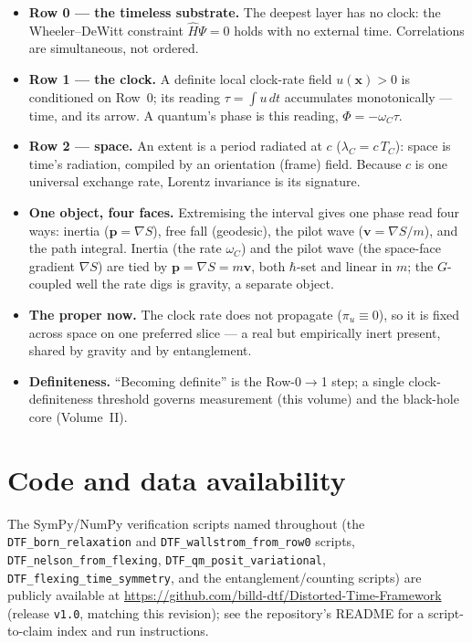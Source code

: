 \documentclass[11pt]{article}
\begin{document}
\begin{itemize}[leftmargin=1.4em,itemsep=3pt,topsep=3pt]
  \item \textbf{Row 0 --- the timeless substrate.} The deepest layer has no clock: the Wheeler--DeWitt
    constraint $\hat H\Psi=0$ holds with no external time. Correlations are simultaneous, not ordered.
  \item \textbf{Row 1 --- the clock.} A definite local clock-rate field $u(\mathbf x)>0$ is conditioned
    on Row~0; its reading $\tau=\int u\,dt$ accumulates monotonically --- time, and its arrow. A
    quantum's phase is this reading, $\Phi=-\omega_C\tau$.
  \item \textbf{Row 2 --- space.} An extent is a period radiated at $c$ ($\lambda_C=c\,T_C$): space is
    time's radiation, compiled by an orientation (frame) field. Because $c$ is one universal exchange
    rate, Lorentz invariance is its signature.
  \item \textbf{One object, four faces.} Extremising the interval gives one phase read four ways: inertia
    ($\mathbf p=\nabla S$), free fall (geodesic), the pilot wave ($\mathbf v=\nabla S/m$), and the path
    integral. Inertia (the rate $\omega_C$) and the pilot wave (the space-face gradient $\nabla S$) are
    tied by $\mathbf p=\nabla S=m\mathbf v$, both $\hbar$-set and linear in $m$; the $G$-coupled well the
    rate digs is gravity, a separate object.
  \item \textbf{The proper now.} The clock rate does not propagate ($\pi_u\equiv0$), so it is fixed
    across space on one preferred slice --- a real but empirically inert present, shared by gravity and
    by entanglement.
  \item \textbf{Definiteness.} ``Becoming definite'' is the Row-0$\to$1 step; a single
    clock-definiteness threshold governs measurement (this volume) and the black-hole core (Volume~II).
\end{itemize}

\section*{Code and data availability}
{\small The SymPy/NumPy verification scripts named throughout (the \texttt{DTF\_born\_relaxation} and
\texttt{DTF\_wallstrom\_from\_row0} scripts, \texttt{DTF\_nelson\_from\_flexing},
\texttt{DTF\_qm\_posit\_variational}, \texttt{DTF\_flexing\_time\_symmetry}, and the entanglement/counting
scripts) are publicly available at \url{https://github.com/billd-dtf/Distorted-Time-Framework} (release
\texttt{v1.0}, matching this revision); see the repository's README for a script-to-claim index and run
instructions.\par}
\end{document}
